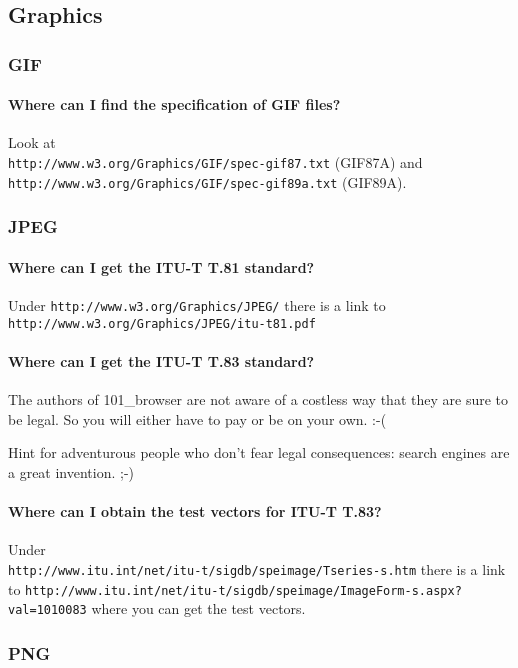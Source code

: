 \documentclass[10pt]{scrbook}
\begin{document}
\subsection{Graphics}

\subsubsection{GIF}

\paragraph{Where can I find the specification of GIF files?}
Look at \\
\verb|http://www.w3.org/Graphics/GIF/spec-gif87.txt| (GIF87A) and \\
\verb|http://www.w3.org/Graphics/GIF/spec-gif89a.txt| (GIF89A).

\subsubsection{JPEG}

\paragraph{Where can I get the ITU-T T.81 standard?} Under \verb|http://www.w3.org/Graphics/JPEG/| there is a link to \verb|http://www.w3.org/Graphics/JPEG/itu-t81.pdf|

\paragraph{Where can I get the ITU-T T.83 standard?} The authors of 101\_browser are not aware of a costless way that they are sure to be legal. So you will either have to pay or be on your own. :-(

Hint for adventurous people who don't fear legal consequences: search engines are a great invention. ;-)

\paragraph{Where can I obtain the test vectors for ITU-T T.83?} Under \\
\verb|http://www.itu.int/net/itu-t/sigdb/speimage/Tseries-s.htm|
there is a link to
\verb|http://www.itu.int/net/itu-t/sigdb/speimage/ImageForm-s.aspx?val=1010083|
where you can get the test vectors.

\subsubsection{PNG}
\end{document}
